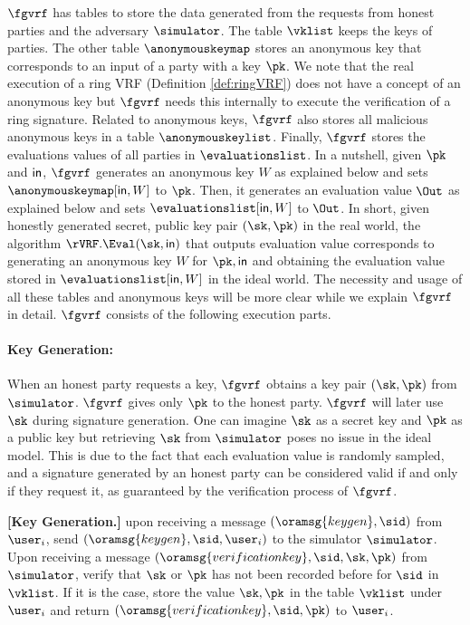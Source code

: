$ \fgvrf $ has tables to store the data generated from the requests from honest parties and the adversary $ \simulator $. The table $ \vklist $  keeps the keys of parties. The other table  $ \anonymouskeymap $ stores an anonymous key that corresponds to an input  of a party with a key $ \pk $. We note that the real execution of a ring VRF (Definition \ref{def:ringVRF}) does not have a concept of an anonymous key but $ \fgvrf $ needs this internally to execute the verification of a ring signature. Related to anonymous keys, $ \fgvrf $ also stores  all  malicious anonymous keys in a table $ \anonymouskeylist $. Finally, $ \fgvrf $ stores the evaluations values of all parties in $ \evaluationslist $. In a nutshell,  given $ \pk $
and $ \mathsf{in} $, $ \fgvrf $  generates an anonymous key $ W $ as explained below and  sets $ \anonymouskeymap[\msg,W]  $ to $ \pk $. Then, it generates an evaluation value $ \Out $ as explained below and sets $ \evaluationslist[\msg,W]  $ to $ \Out $. In short, given honestly generated secret, public key pair $ (\sk,\pk) $ in the real world, the algorithm
$ \rVRF.\Eval(\sk,\msg) $  that outputs evaluation value corresponds to generating an anonymous key $ W $ for $ \pk, \msg $ and obtaining the evaluation value stored in $ \evaluationslist[\msg,W] $ in the ideal world. The necessity and usage of all these tables and anonymous keys will be more clear while we explain $ \fgvrf $ in detail. $ \fgvrf $ consists of the following execution parts.



\paragraph{Key Generation:}  When an honest party requests  a key, $ \fgvrf $ obtains a key pair $ (\sk, \pk) $ from $ \simulator $. $ \fgvrf $ gives only $ \pk $ to the honest party. $ \fgvrf $ will later use $ \sk $ during signature generation. One can imagine $ \sk $ as a secret key and $ \pk $ as a public key but retrieving $ \sk $ from $ \simulator $ poses no issue in the ideal model. This is due to the fact that each evaluation value is randomly sampled, and a signature generated by an honest party can be considered valid if and only if they request it, as guaranteed by the verification process of $\fgvrf$.



\begin{tcolorbox}[left=2pt,right=2pt]
	\eprint{}{\small}
	\textbf{[Key Generation.]} upon receiving a message $(\oramsg{keygen}, \sid)$ from  $\user_i$, send $(\oramsg{keygen}, \sid, \user_i)$ to the simulator $\simulator$.
	Upon receiving a message $(\oramsg{verificationkey}, \sid, \sk,\pk)$ from $\simulator$, verify that $\sk $ or $\pk$ has not been recorded before for $ \sid $ in $ \vklist $. If it is the case, store  the value $\sk,\pk$ in the table $\vklist$ under $\user_i$ and return $(\oramsg{verificationkey}, \sid, \pk)$ to $ \user_i$.
\end{tcolorbox}


